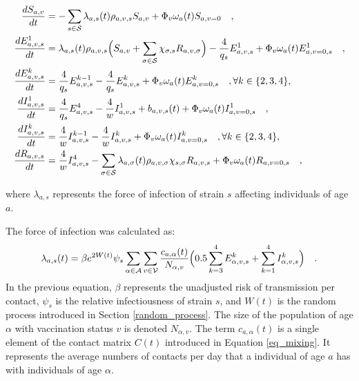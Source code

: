 \begin{equation}
    \label{ode}
    \begin{split}
\frac{dS_{a,v}}{dt} & = -\sum_{s \in \mathcal{S}} \lambda_{a,s}(t)\rho_{a,v,s} S_{a,v} + \Phi_v\omega_a(t)S_{a,v=0}  \quad , \\
\frac{dE_{a,v,s}^{1}}{dt} & =\lambda_{a,s}(t)\rho_{a,v,s} \Bigl(S_{a,v}  +  \sum_{\sigma \in \mathcal{S}} \chi_{\sigma, s} R_{a,v,\sigma} \Bigr) - \frac{4}{q_{s}}E_{a,v,s}^{1} + \Phi_v\omega_a(t)E_{a,v=0,s}^1 \quad , \\
\frac{dE_{a,v,s}^{k}}{dt} & = \frac{4}{q_{s}}E_{a,v,s}^{k-1} - \frac{4}{q_{s}}E_{a,v,s}^{k} + \Phi_v\omega_a(t)E_{a,v=0,s}^k \quad,  \forall k \in \{2,3,4\} , \\
\frac{dI_{a,v,s}^{1}}{dt} & = \frac{4}{q_{s}}E_{a,v,s}^{4} - \frac{4}{w}I_{a,v,s}^{1} + b_{a,v,s}(t) + \Phi_v\omega_a(t)I_{a,v=0,s}^1 \quad , \\
\frac{dI_{a,v,s}^{k}}{dt} & = \frac{4}{w}I_{a,v,s}^{k-1} - \frac{4}{w}I_{a,v,s}^{k} + \Phi_v\omega_a(t)I_{a,v=0,s}^k \quad, \forall k \in \{2,3,4\} , \\
\frac{dR_{a,v,s}}{dt} & = \frac{4}{w}I_{a,v,s}^{4} - \sum _{\sigma \in \mathcal{S}} \lambda_{a,\sigma}(t)\rho_{a,v,\sigma} \chi_{s, \sigma} R_{a,v, s} + \Phi_v\omega_a(t)R_{a,v=0,s} \quad, 
    \end{split}
\end{equation}

where $\lambda_{a,s}$ represents the force of infection of strain $s$ affecting individuals of age $a$.

The force of infection was calculated as:
\begin{equation}
    \label{foi}
 \lambda_{a,s}(t) = \beta e^{2W(t)} \psi_{s} \sum_{\alpha \in \mathcal{A}} \sum_{v \in \mathcal{V}} \frac{c_{a,\alpha}(t)}{N_{\alpha, v}} \Bigl( 0.5 \sum_{k=3}^{4} E_{\alpha,v,s}^{k} + \sum_{k=1}^{4} I_{\alpha,v,s}^{k} \Bigr) \quad .
\end{equation}
In the previous equation, $\beta$ represents the unadjusted risk of transmission per contact, $\psi_{s}$ is the relative infectiousness of strain $s$, and $W(t)$ is
the random process introduced in Section \ref{random_process}. The size of the population of age $\alpha$ with vaccination status $v$ is denoted $N_{\alpha, v}$. The term $c_{a,\alpha}(t)$ is a single element of the contact matrix $C(t)$ introduced in Equation \ref{eq_mixing}. It
represents the average numbers of contacts per day that a individual of age $a$ has with individuals of age $\alpha$.
